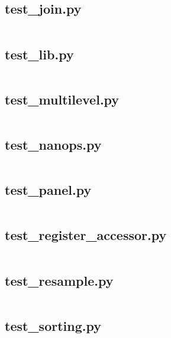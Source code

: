 \documentclass{article}
\begin{document}
\subsection{test\_join.py}
\inputminted{python}{/home/dufferzafar/dev/@clones/pandas/pandas/tests/test_join.py}
\newpage

\subsection{test\_lib.py}
\inputminted{python}{/home/dufferzafar/dev/@clones/pandas/pandas/tests/test_lib.py}
\newpage

\subsection{test\_multilevel.py}
\inputminted{python}{/home/dufferzafar/dev/@clones/pandas/pandas/tests/test_multilevel.py}
\newpage

\subsection{test\_nanops.py}
\inputminted{python}{/home/dufferzafar/dev/@clones/pandas/pandas/tests/test_nanops.py}
\newpage

\subsection{test\_panel.py}
\inputminted{python}{/home/dufferzafar/dev/@clones/pandas/pandas/tests/test_panel.py}
\newpage

\subsection{test\_register\_accessor.py}
\inputminted{python}{/home/dufferzafar/dev/@clones/pandas/pandas/tests/test_register_accessor.py}
\newpage

\subsection{test\_resample.py}
\inputminted{python}{/home/dufferzafar/dev/@clones/pandas/pandas/tests/test_resample.py}
\newpage

\subsection{test\_sorting.py}
\inputminted{python}{/home/dufferzafar/dev/@clones/pandas/pandas/tests/test_sorting.py}
\newpage
\end{document}
